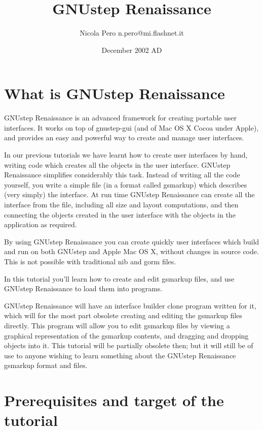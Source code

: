 \documentclass[a4paper]{article}
\begin{document}
\author{Nicola Pero n.pero@mi.flashnet.it}
\title{GNUstep Renaissance}
\date{December 2002 AD}
\maketitle

\section{What is GNUstep Renaissance}

GNUstep Renaissance is an advanced framework for creating portable
user interfaces.  It works on top of gnustep-gui (and of Mac OS X
Cocoa under Apple), and provides an easy and powerful way to create
and manage user interfaces.

In our previous tutorials we have learnt how to create user interfaces
by hand, writing code which creates all the objects in the user
interface.  GNUstep Renaissance simplifies considerably this task.
Instead of writing all the code yourself, you write a simple file (in
a format called gsmarkup) which describes (very simply) the interface.
At run time GNUstep Renaissance can create all the interface from the
file, including all size and layout computations, and then connecting
the objects created in the user interface with the objects in the
application as required.

By using GNUstep Renaissance you can create quickly user interfaces
which build and run on both GNUstep and Apple Mac OS X, without changes in
source code.  This is not possible with traditional nib and gorm
files.

In this tutorial you'll learn how to create and edit gsmarkup files,
and use GNUstep Renaissance to load them into programs.

GNUstep Renaissance will have an interface builder clone program
written for it, which will for the most part obsolete creating and
editing the gsmarkup files directly.  This program will allow you to
edit gsmarkup files by viewing a graphical representation of the
gsmarkup contents, and dragging and dropping objects into it.  This
tutorial will be partially obsolete then; but it will still be of use
to anyone wishing to learn something about the GNUstep Renaissance
gsmarkup format and files.

\section{Prerequisites and target of the tutorial}
\end{document}
